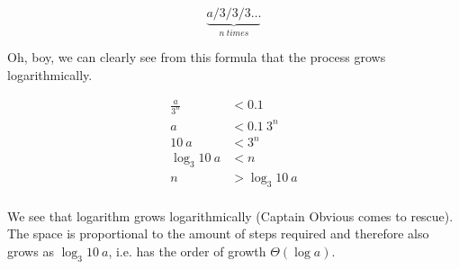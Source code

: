 \begin{equation}
	\underbrace{a / 3 / 3 / 3 \dots}_{n\ times}
\end{equation}

Oh, boy, we can clearly see from this formula that the process grows logarithmically.

\[
	\begin{aligned}
		\frac {a} {3^n} &< 0.1 \\
		a &< 0.1\ 3^n \\
		10\ a &< 3^n \\
		\log _3 10\ a &< n \\
		n &> \log _3 10\ a \\
	\end{aligned}
\]

We see that logarithm grows logarithmically (Captain Obvious comes to rescue). The space is proportional to the amount of steps required and therefore also grows as $\log _3 10\ a$, i.e. has the order of growth $\Theta(\log a)$.
